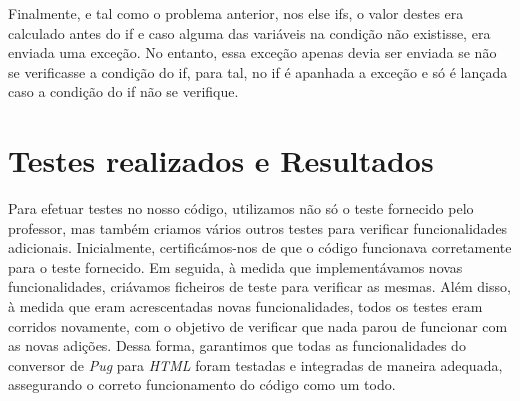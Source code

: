 \documentclass[11pt,a4paper]{report}%
\begin{document}
Finalmente, e tal como o problema anterior, nos else ifs, o valor destes era calculado antes do if e caso alguma das variáveis na condição não existisse, era enviada uma exceção. No entanto, essa exceção apenas devia ser enviada se não se verificasse a condição do if, para tal, no if é apanhada a exceção e só é lançada caso a condição do if não se verifique.


\section{Testes realizados e Resultados}


Para efetuar testes no nosso código, utilizamos não só o teste fornecido pelo professor, mas também criamos vários outros testes para verificar funcionalidades adicionais. Inicialmente, certificámos-nos de que o código funcionava corretamente para o teste fornecido. Em seguida, à medida que implementávamos novas funcionalidades, criávamos ficheiros de teste para verificar as mesmas. Além disso, à medida que eram acrescentadas novas funcionalidades, todos os testes eram corridos novamente, com o objetivo de verificar que nada parou de funcionar com as novas adições. Dessa forma, garantimos que todas as funcionalidades do conversor de \textit{Pug} para \textit{HTML} foram testadas e integradas de maneira adequada, assegurando o correto funcionamento do código como um todo.
\end{document}
